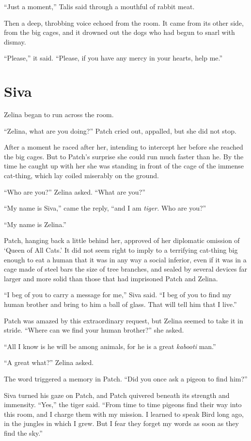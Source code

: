 \documentclass[ebook,oneside,openany,17pt]{memoir}
\renewcommand{\thechapter}{\Roman{chapter}}
\newcounter{sections}
\newcommand{\sections}[1]{%
  \section*{#1}
  \addtocounter{sections}{1}%
  \pdfbookmark[1]{#1}{section.\thechapter.\thesections}}
\begin{document}
“Just a moment,” Talis said through a mouthful of rabbit meat.

Then a deep, throbbing voice echoed from the room. It came from its
other side, from the big cages, and it drowned out the dogs who had
begun to snarl with dismay.

“Please,” it said. “Please, if you have any mercy in your hearts, help
me.”


\sections{Siva}

Zelina began to run across the room.

“Zelina, what are you doing?” Patch cried out, appalled, but she did
not stop.

After a moment he raced after her, intending to intercept her before
she reached the big cages. But to Patch’s surprise she could run much
faster than he. By the time he caught up with her she was standing in
front of the cage of the immense cat-thing, which lay coiled miserably
on the ground.

“Who are you?” Zelina asked. “What are you?”

“My name is Siva,” came the reply, “and I am \emph{tiger.} Who are
you?”

“My name is Zelina.”

Patch, hanging back a little behind her, approved of her diplomatic
omission of ‘Queen of All Cats.’ It did not seem right to imply to a
terrifying cat-thing big enough to eat a human that it was in any way
a social inferior, even if it was in a cage made of steel bars the
size of tree branches, and sealed by several devices far larger and
more solid than those that had imprisoned Patch and Zelina.

“I beg of you to carry a message for me,” Siva said. “I beg of you to
find my human brother and bring to him a ball of glass. That will tell
him that I live.”

Patch was amazed by this extraordinary request, but Zelina seemed to
take it in stride. “Where can we find your human brother?” she asked.

“All I know is he will be among animals, for he is a great
\emph{kabooti} man.”

“A great what?” Zelina asked.

The word triggered a memory in Patch. “Did you once ask a pigeon to
find him?”

Siva turned his gaze on Patch, and Patch quivered beneath its strength
and immensity. “Yes,” the tiger said. “From time to time pigeons find
their way into this room, and I charge them with my mission. I learned
to speak Bird long ago, in the jungles in which I grew. But I fear
they forget my words as soon as they find the sky.”
\end{document}
